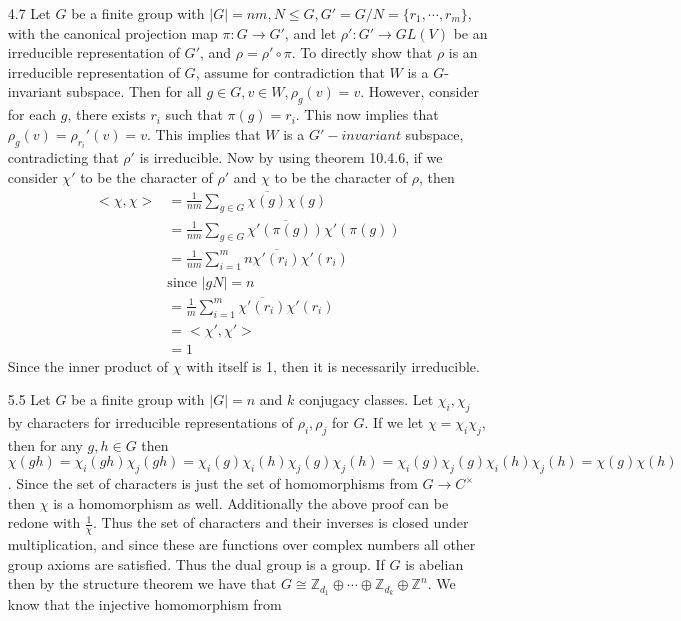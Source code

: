 \documentclass[12pt, letterpaper]{article}
\newcommand{\Z}{\mathbb{Z}}
\begin{document}
\begin{enumerate}
\begin{enumerate}
	\end{enumerate}
	\item[4.7] Let $G$ be a finite group with $|G| = nm, N \leq G, G' = G / N = \{r_1,\cdots,r_m\}$, with the canonical projection map $\pi : G \to G'$, 
	and let $\rho': G' \to GL(V)$ be an irreducible representation of $G'$, and $\rho = \rho' \circ \pi$.  To directly 
	show that $\rho$ is an irreducible representation of $G$, assume for contradiction that $W$ is a $G$-invariant
	subspace.  Then for all $g \in G, v \in W, \rho_g(v) = v$.  However, consider for each $g$, there exists $r_i$ 
	such that $\pi(g) = r_i$.  This now implies that $\rho_g(v) = \rho_{r_i}'(v) = v$.  This implies that 
	$W$ is a $G'-invariant$ subspace, contradicting that $\rho'$ is irreducible.  Now by using theorem 10.4.6, 
	if we consider $\chi'$ to be the character of $\rho'$ and $\chi$ to be the character of $\rho$, then 
	\begin{align*}
	<\chi,\chi> &= \frac{1}{nm} \sum_{g \in G} \overline{\chi(g)}\chi(g)\\
	&= \frac{1}{nm} \sum_{g \in G} \overline{\chi'(\pi(g))}\chi'(\pi(g))\\
	&= \frac{1}{nm} \sum_{i=1}^m n \overline{\chi'(r_i)}\chi'(r_i)\\
	& \text{since } |gN| = n\\
	&= \frac{1}{m}\sum_{i=1}^m \overline{\chi'(r_i)}\chi'(r_i)\\ 
	&= <\chi',\chi'> \\
	&= 1
	\end{align*}
	Since the inner product of $\chi$ with itself is 1, then it is necessarily irreducible.  
	\item[5.5] Let $G$ be a finite group with $|G| = n$ and $k$ conjugacy classes.  Let $\chi_i, \chi_j$ by characters for irreducible representations of $\rho_i, \rho_j$ for 
	$G$.  If we let $\chi = \chi_i \chi_j$, then for any $g,h \in G$ then $\chi(gh) = \chi_i(gh)\chi_j(gh) = 
	\chi_i(g)\chi_i(h)\chi_j(g)\chi_j(h) = \chi_i(g)\chi_j(g)\chi_i(h)\chi_j(h) = \chi(g)\chi(h)$.  Since the 
	set of characters is just the set of homomorphisms from $G \to C^{\times}$ then $\chi$ is a homomorphism as well. 
	Additionally the above proof can be redone with $\frac{1}{\chi}$.  Thus the set of characters and their 
	inverses is closed under 
	multiplication, and since these are functions over complex numbers all other group axioms are satisfied.  Thus the 
	dual group is a group.  If $G$ is abelian then by the structure theorem we have that 
	$G \cong \Z_{d_1} \oplus \cdots \oplus \Z_{d_k} \oplus \Z^n$.  We know that the injective homomorphism from 

\end{enumerate}
\end{document}
